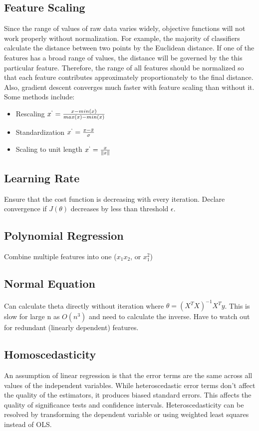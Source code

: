 \documentclass[12pt]{article}
\begin{document}
\subsection{Feature Scaling}
Since the range of values of raw data varies widely, objective functions will not work properly without normalization. For example, the majority of classifiers calculate the distance between two points by the Euclidean distance. If one of the features has a broad range of values, the distance will be governed by the this particular feature. Therefore, the range of all features should be normalized so that each feature contributes approximately proportionately to the final distance. Also, gradient descent converges much faster with feature scaling than without it. Some methods include:
\begin{itemize}
    \item Rescaling $x^`= \frac{x-min(x)}{max(x)-min(x)}$
    \item Standardization $x^` = \frac{x-\bar{x}}{\sigma}$
    \item Scaling to unit length $x^` = \frac{x}{\Vert x\Vert}$
\end{itemize}

\subsection{Learning Rate}
Ensure that the cost function is decreasing with every iteration. Declare convergence if $J(\theta)$ decreases by less than threshold $\epsilon$.

\subsection{Polynomial Regression}
Combine multiple features into one ($x_1x_2$, or $x_1^2$)

\subsection{Normal Equation}
Can calculate theta directly without iteration where $\theta = (X^TX)^{-1}X^Ty$. This is slow for large n as $O(n^3)$ and need to calculate the inverse. Have to watch out for redundant (linearly dependent) features.

\subsection{Homoscedasticity}
An assumption of linear regression is that the error terms are the same across all values of the independent variables. While heteroscedastic error terms don't affect the quality of the estimators, it produces biased standard errors. This affects the quality of significance tests and confidence intervals. Heteroscedasticity can be resolved by transforming the dependent variable or using weighted least squares instead of OLS.
\end{document}
